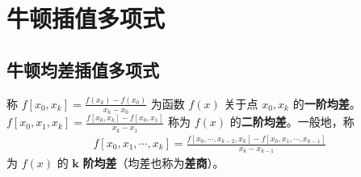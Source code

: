 \documentclass[../../main.tex]{subfiles}
\begin{document}
\section{牛顿插值多项式}

\subsection{牛顿均差插值多项式}

\begin{definition}[均差]
称 $f[x_0, x_k] = \frac{f(x_k) - f(x_0)}{x_k - x_0}$ 为函数 $f(x)$ 关于点 $x_0, x_k$ 的\textbf{一阶均差}。$f[x_0, x_1, x_k] = \frac{f[x_0, x_k] - f[x_0, x_1]}{x_k - x_1}$ 称为 $f(x)$ 的\textbf{二阶均差}。一般地，称 
\begin{align}
f[x_0, x_1, \cdots, x_k] = \frac{f[x_0, \cdots, x_{k - 2}, x_k] - f[x_0, x_1, \cdots, x_{k - 1}]}{x_k - x_{k - 1}} \label{eq:数值分析-3.3}
\end{align}
为 $f(x)$ 的 $\boldsymbol{k}$ \textbf{阶均差}（均差也称为\textbf{差商}）。
\end{definition}
\end{document}
